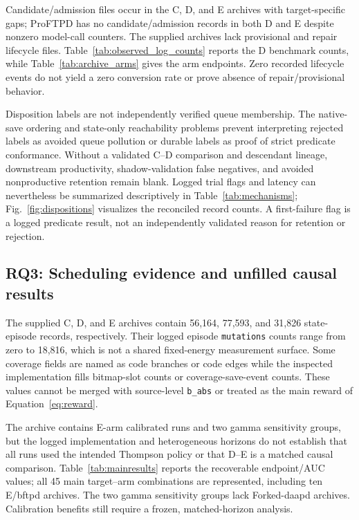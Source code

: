 \documentclass[final,5p,times,number]{elsarticle}
\newcommand{\figref}[1]{Fig.~\ref{#1}}
\begin{document}
Candidate/admission files occur in the C, D, and E archives with target-specific gaps; ProFTPD has no candidate/admission records in both D and E despite nonzero model-call counters. The supplied archives lack provisional and repair lifecycle files. Table~\ref{tab:observed_log_counts} reports the D benchmark counts, while Table~\ref{tab:archive_arms} gives the arm endpoints. Zero recorded lifecycle events do not yield a zero conversion rate or prove absence of repair/provisional behavior.

Disposition labels are not independently verified queue membership. The native-save ordering and state-only reachability problems prevent interpreting rejected labels as avoided queue pollution or durable labels as proof of strict predicate conformance. Without a validated C--D comparison and descendant lineage, downstream productivity, shadow-validation false negatives, and avoided nonproductive retention remain blank. Logged trial flags and latency can nevertheless be summarized descriptively in Table~\ref{tab:mechanisms}; \figref{fig:dispositions} visualizes the reconciled record counts. A first-failure flag is a logged predicate result, not an independently validated reason for retention or rejection.

\subsection{RQ3: Scheduling evidence and unfilled causal results}
The supplied C, D, and E archives contain 56,164, 77,593, and 31,826 state-episode records, respectively. Their logged episode \texttt{mutations} counts range from zero to 18,816, which is not a shared fixed-energy measurement surface. Some coverage fields are named as code branches or code edges while the inspected implementation fills bitmap-slot counts or coverage-save-event counts. These values cannot be merged with source-level \texttt{b\_abs} or treated as the main reward of Equation~\ref{eq:reward}.

The archive contains E-arm calibrated runs and two gamma sensitivity groups, but the logged implementation and heterogeneous horizons do not establish that all runs used the intended Thompson policy or that D--E is a matched causal comparison. Table~\ref{tab:mainresults} reports the recoverable endpoint/AUC values; all 45 main target--arm combinations are represented, including ten E/bftpd archives. The two gamma sensitivity groups lack Forked-daapd archives. Calibration benefits still require a frozen, matched-horizon analysis.
\end{document}

